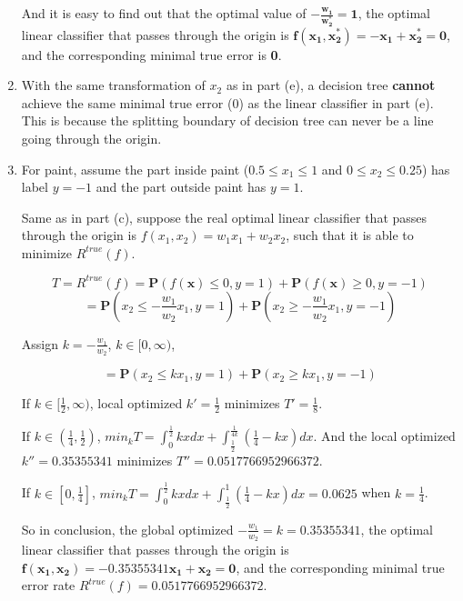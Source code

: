 \documentclass[paper=letter, fontsize=12pt]{article}
\begin{document}
\begin{enumerate}[label=(\alph*)]
	And it is easy to find out that the optimal value of $\mathbf{-\frac{w_1}{w_2^*} = 1}$, the optimal linear classifier that passes through the origin is $\mathbf{f(x_1, x_2^*) = -x_1 + x_2^* = 0}$, and the corresponding minimal true error is \textbf{0}.
	
	\item With the same transformation of $x_2$ as in part (e), a decision tree \textbf{cannot} achieve the same minimal true error (0) as the linear classifier in part (e). This is because the splitting boundary of decision tree can never be a line going through the origin.
	
	\item For paint, assume the part inside paint ($0.5 \leq x_1 \leq 1$ and $0 \leq x_2 \leq 0.25$) has label $y = -1$ and the part outside paint has $y = 1$.
	 
	Same as in part (c), suppose the real optimal linear classifier that passes through the origin is $f(x_1, x_2) = w_1 x_1 + w_2 x_2$, such that it is able to minimize $R^{true}(f)$.
	
	\begin{equation}
	T = R^{true}(f) = \mathbf{P}(f(\mathbf{x}) \leq 0, y = 1) + \mathbf{P}(f(\mathbf{x}) \geq 0, y = -1)
	\end{equation}
	\begin{equation}
	= \mathbf{P}(x_2 \leq -\frac{w_1}{w_2} x_1, y = 1) +\mathbf{P}(x_2 \geq -\frac{w_1}{w_2} x_1, y = -1)
	\end{equation}
	
	Assign $k = -\frac{w_1}{w_2}$, $k \in [0, \infty)$,
	
	\begin{equation}
	=\mathbf{P}(x_2 \leq k x_1, y = 1) + \mathbf{P}(x_2 \geq k x_1, y = -1)
	\end{equation}
	
	If $k \in [\frac{1}{2}, \infty)$, local optimized $k' = \frac{1}{2}$ minimizes $T' = \frac{1}{8}$.
	
	If $k \in (\frac{1}{4}, \frac{1}{2})$, $min_{k} T = \int_{0}^{\frac{1}{2}} kx dx + \int_{\frac{1}{2}}^{\frac{1}{4k}} (\frac{1}{4} - kx) dx$. And the local optimized $k'' = 	0.35355341$ minimizes $T'' = 0.0517766952966372$.
	
	If $k \in [0, \frac{1}{4}]$, $min_{k} T = \int_{0}^{\frac{1}{2}} kx dx + \int_{\frac{1}{2}}^{1}(\frac{1}{4} - kx) dx = 0.0625$ when $k = \frac{1}{4}$.

	So in conclusion, the global optimized $-\frac{w_1}{w_2} = k = \mathbf{0.35355341}$, the optimal linear classifier that passes through the origin is $\mathbf{f(x_1, x_2) = -0.35355341 x_1 + x_2 = 0}$, and the corresponding minimal true error rate $R^{true}(f) = \mathbf{0.0517766952966372}$.
	

\end{enumerate}
\end{document}
